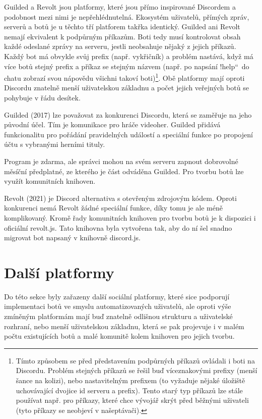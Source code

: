 \documentclass[FM]{tulthesis}
\begin{document}
	Guilded a Revolt jsou platformy, které jsou přímo inspirované Discordem a podobnost mezi nimi je nepřehlédnutelná. Ekosystém uživatelů, přímých zpráv, serverů a botů je u těchto tří platforem takřka identický. Guilded ani Revolt nemají ekvivalent k podpůrným příkazům. Boti tedy musí kontrolovat obsah každé odeslané zprávy na serveru, jestli neobsahuje nějaký z jejich příkazů. Každý bot má obvykle svůj prefix (např. vykřičník) a problém nastává, když má více botů stejný prefix a příkaz se stejným názvem (např. po napsání \quotedblbase!help\textquotedblleft\ do chatu zobrazí svou nápovědu všichni takoví boti)\footnote{Tímto způsobem se před představením podpůrných příkazů ovládali i boti na Discordu. Problém stejných příkazů se řešil buď víceznakovými prefixy (menší šance na kolizi), nebo nastavitelným prefixem (to vyžaduje nějaké úložiště uchovávající dvojice id serveru a prefix). Tento starý typ příkazů lze stále používat např. pro příkazy, které chce vývojář skrýt před běžnými uživateli (tyto příkazy se neobjeví v našeptávači).}. Obě platformy mají oproti Discordu znatelně menší uživatelskou základnu a počet jejich veřejných botů se pohybuje v řádu desítek.
	
	Guilded (2017) lze považovat za konkurenci Discordu, která se zaměřuje na jeho původní účel. Tím je komunikace pro hráče videoher. Guilded přidává funkcionalitu pro pořádání pravidelných událostí a speciální funkce po propojení účtu s vybranými herními tituly. \cite{web_guilded} 
	
	Program je zdarma, ale správci mohou na svém serveru zapnout dobrovolné měsíční předplatné, ze kterého je část odváděna Guilded. Pro tvorbu botů lze využít komunitních knihoven.
	
	Revolt (2021) je Discord alternativa s otevřeným zdrojovým kódem. Oproti konkurenci nemá Revolt žádné speciální funkce, díky tomu je ale méně komplikovaný. Kromě řady komunitních knihoven pro tvorbu botů je k dispozici i oficiální revolt.js. Tato knihovna byla vytvořena tak, aby do ní šel snadno migrovat bot napsaný v knihovně discord.js.
	
	\section{Další platformy}
	
	Do této sekce byly zařazeny další sociální platformy, které sice podporují implementaci botů ve smyslu automatizovaných uživatelů, ale oproti výše zmíněným platformám mají buď znatelně odlišnou strukturu a uživatelské rozhraní, nebo menší uživatelskou základnu, která se pak projevuje i v malém počtu existujících botů a malé komunitě kolem knihoven pro jejich tvorbu.
	
\end{document}
